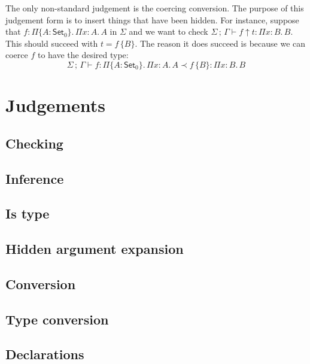 \documentclass[a4paper,11pt]{article}
\newcommand\Hid[1]{\{#1\}}
\newcommand\vPi[2]{\Pi#1:#2.\,}
\newcommand\vhPi[2]{\Pi\{#1:#2\}.\,}
\newcommand\Set[1]{\mathsf{Set}_#1}
\renewcommand\Check[5]{#1\,;\,#2\vdash#3\uparrow#4:#5}
\newcommand\Expand[6]{#1\,;\,#2\vdash#3:#4\prec#5:#6}
\begin{document}
    The only non-standard judgement is the coercing conversion. The purpose of
    this judgement form is to insert things that have been hidden. For
    instance, suppose that $f:\vhPi A{\Set0}\vPi xAA$ in $\Sigma$ and we want
    to check $\Check\Sigma\Gamma ft{\vPi xBB}$. This should succeed with $t =
    f\,\Hid{B}$. The reason it does succeed is because we can coerce $f$ to
    have the desired type:
    \[
	\Expand\Sigma\Gamma f{\vhPi A{\Set0}\vPi xAA}{f\,\Hid{B}}{\vPi xBB}
    \]

\section{Judgements}

\subsection{Checking}

\subsection{Inference}

\subsection{Is type}

\subsection{Hidden argument expansion}

\subsection{Conversion}

\subsection{Type conversion}

\subsection{Declarations}
\end{document}
